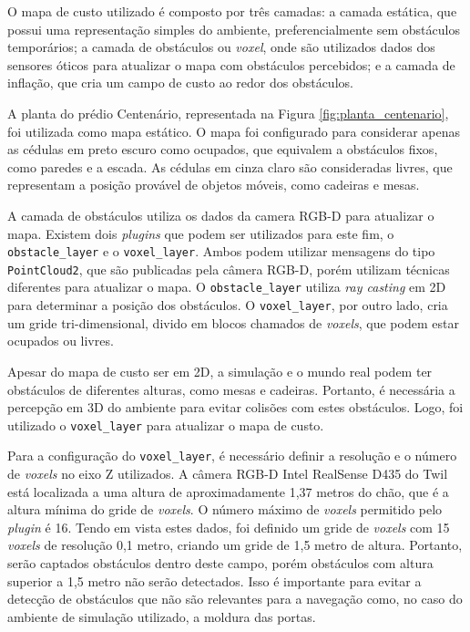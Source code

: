 \documentclass[repeatfields,xlists,xpacks,oneside,yearsonly]{ufrgscca}
\begin{document}
O mapa de custo utilizado é composto por três camadas: a camada
estática, que possui uma representação simples do ambiente,
preferencialmente sem obstáculos temporários; a camada de obstáculos
ou \textit{voxel}, onde são utilizados dados dos sensores óticos para
atualizar o mapa com obstáculos percebidos; e a camada de inflação,
que cria um campo de custo ao redor dos obstáculos.

A planta do prédio Centenário, representada na Figura
\ref{fig:planta_centenario}, foi utilizada como mapa estático. O mapa
foi configurado para considerar apenas as cédulas em preto escuro
como ocupados, que equivalem a obstáculos fixos, como paredes e a
escada. As cédulas em cinza claro são consideradas livres, que
representam a posição provável de objetos móveis, como cadeiras e
mesas.

A camada de obstáculos utiliza os dados da camera RGB-D para
atualizar o mapa. Existem dois \textit{plugins} que podem ser
utilizados para este fim, o \texttt{obstacle\_layer} e o
\texttt{voxel\_layer}. Ambos podem utilizar mensagens do tipo
\texttt{PointCloud2}, que são publicadas pela câmera RGB-D, porém
utilizam técnicas diferentes para atualizar o mapa.  O \texttt{obstacle\_layer} utiliza
\textit{ray casting} em 2D para determinar a posição dos obstáculos.
O \texttt{voxel\_layer}, por outro lado, cria um gride
tri-dimensional, divido em blocos chamados de \textit{voxels}, que
podem estar ocupados ou livres.

Apesar do mapa de custo ser em 2D, a simulação e o mundo real podem
ter obstáculos de diferentes alturas, como mesas e cadeiras.
Portanto, é necessária a percepção em 3D do ambiente para evitar
colisões com estes obstáculos. Logo, foi utilizado o
\texttt{voxel\_layer} para atualizar o mapa de custo.

Para a configuração do \texttt{voxel\_layer}, é necessário definir a
resolução e o número de \textit{voxels} no eixo Z utilizados. A
câmera RGB-D Intel RealSense D435 do Twil está localizada a uma
altura de aproximadamente 1,37 metros do chão, que é a altura mínima
do gride de \textit{voxels}. O número máximo de \textit{voxels}
permitido pelo \textit{plugin} é 16. Tendo em vista estes dados, foi
definido um gride de \textit{voxels} com 15 \textit{voxels} de
resolução 0,1 metro, criando um gride de 1,5 metro de altura.
Portanto, serão captados obstáculos dentro deste campo, porém
obstáculos com altura superior a 1,5 metro não serão detectados. Isso
é importante para evitar a detecção de obstáculos que não são
relevantes para a navegação como, no caso do ambiente de simulação
utilizado, a moldura das portas.
\end{document}
